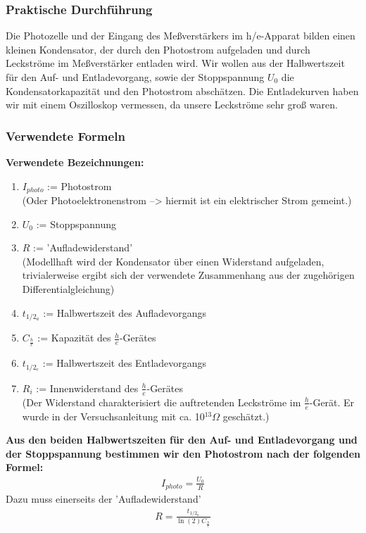 \documentclass[12px]{scrartcl}
\begin{document}
\subsubsection{Praktische Durchführung}
Die Photozelle und der Eingang des Meßverstärkers im h/e-Apparat bilden einen kleinen Kondensator, der durch den Photostrom aufgeladen und durch Leckströme im Meßverstärker entladen wird.
Wir wollen aus der Halbwertszeit für den Auf- und Entladevorgang, sowie der Stoppspannung $U_0$ die Kondensatorkapazität und den Photostrom abschätzen. Die Entladekurven haben wir mit einem Oszilloskop vermessen, da unsere Leckströme sehr groß waren.
\subsubsection{Verwendete Formeln}
\textbf{Verwendete Bezeichnungen:}
\begin{enumerate}
\item $I_{photo}$ := Photostrom\\
(Oder Photoelektronenstrom --> hiermit ist ein elektrischer Strom gemeint.)
\item $U_0$ := Stoppspannung
\item $R$ := 'Aufladewiderstand'\\
(Modellhaft wird der Kondensator über einen Widerstand aufgeladen, trivialerweise ergibt sich der verwendete Zusammenhang aus der zugehörigen Differentialgleichung)
\item $t_{1/2_a}$ := Halbwertszeit des Aufladevorgangs
\item $C_{\frac{h}{e}}$ := Kapazität des $\frac{h}{e}$-Gerätes
\item $t_{1/2_e}$ := Halbwertszeit des Entladevorgangs
\item $R_i$ := Innenwiderstand des $\frac{h}{e}$-Gerätes\\
(Der Widerstand charakterisiert die auftretenden Leckströme im $\frac{h}{e}$-Gerät. Er wurde in der Versuchsanleitung mit ca. 10$^{13}\Omega$ geschätzt.)
\end{enumerate}
\textbf{Aus den beiden Halbwertszeiten für den Auf- und Entladevorgang und der Stoppspannung bestimmen wir den Photostrom nach der folgenden Formel:}
\begin{align}
I_{photo} = \frac{U_0}{R}
\label{eqn:i_ph}
\end{align}
Dazu muss einerseits der 'Aufladewiderstand'
\begin{align}
R = \frac{t_{1/2_a}}{\ln(2)C_{\frac{h}{e}}}
\label{eqn:R}
\end{align}
\end{document}
